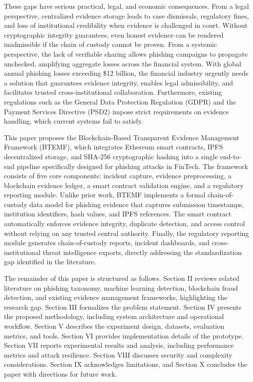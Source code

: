 \documentclass[conference]{IEEEtran}
\begin{document}
These gaps have serious practical, legal, and economic consequences. From a legal perspective, centralized evidence storage leads to case dismissals, regulatory fines, and loss of institutional credibility when evidence is challenged in court. Without cryptographic integrity guarantees, even honest evidence can be rendered inadmissible if the chain of custody cannot be proven. From a systemic perspective, the lack of verifiable sharing allows phishing campaigns to propagate unchecked, amplifying aggregate losses across the financial system. With global annual phishing losses exceeding \$12 billion, the financial industry urgently needs a solution that guarantees evidence integrity, enables legal admissibility, and facilitates trusted cross-institutional collaboration. Furthermore, existing regulations such as the General Data Protection Regulation (GDPR) and the Payment Services Directive (PSD2) impose strict requirements on evidence handling, which current systems fail to satisfy.

This paper proposes the Blockchain-Based Transparent Evidence Management Framework (BTEMF), which integrates Ethereum smart contracts, IPFS decentralized storage, and SHA-256 cryptographic hashing into a single end-to-end pipeline specifically designed for phishing attacks in FinTech. The framework consists of five core components: incident capture, evidence preprocessing, a blockchain evidence ledger, a smart contract validation engine, and a regulatory reporting module. Unlike prior work, BTEMF implements a formal chain-of-custody data model for phishing evidence that captures submission timestamps, institution identifiers, hash values, and IPFS references. The smart contract automatically enforces evidence integrity, duplicate detection, and access control without relying on any trusted central authority. Finally, the regulatory reporting module generates chain-of-custody reports, incident dashboards, and cross-institutional threat intelligence exports, directly addressing the standardization gap identified in the literature.

The remainder of this paper is structured as follows. Section II reviews related literature on phishing taxonomy, machine learning detection, blockchain fraud detection, and existing evidence management frameworks, highlighting the research gap. Section III formalizes the problem statement. Section IV presents the proposed methodology, including system architecture and operational workflow. Section V describes the experiment design, datasets, evaluation metrics, and tools. Section VI provides implementation details of the prototype. Section VII reports experimental results and analysis, including performance metrics and attack resilience. Section VIII discusses security and complexity considerations. Section IX acknowledges limitations, and Section X concludes the paper with directions for future work.
\end{document}
